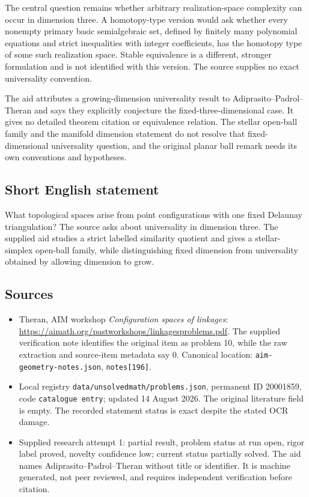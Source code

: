 \documentclass[11pt]{article}
\begin{document}
The central question remains whether arbitrary realization-space complexity can occur in dimension three. A homotopy-type version would ask whether every nonempty primary basic semialgebraic set, defined by finitely many polynomial equations and strict inequalities with integer coefficients, has the homotopy type of some such realization space. Stable equivalence is a different, stronger formulation and is not identified with this version. The source supplies no exact universality convention.

The aid attributes a growing-dimension universality result to Adiprasito--Padrol--Theran and says they explicitly conjecture the fixed-three-dimensional case. It gives no detailed theorem citation or equivalence relation. The stellar open-ball family and the manifold dimension statement do not resolve that fixed-dimensional universality question, and the original planar ball remark needs its own conventions and hypotheses.
\subsection{Short English statement}
What topological spaces arise from point configurations with one fixed Delaunay triangulation? The source asks about universality in dimension three. The supplied aid studies a strict labelled similarity quotient and gives a stellar-simplex open-ball family, while distinguishing fixed dimension from universality obtained by allowing dimension to grow.
\subsection{Sources}
\begin{itemize}
\item Theran, AIM workshop \emph{Configuration spaces of linkages}: \url{https://aimath.org/pastworkshops/linkagesproblems.pdf}. The supplied verification note identifies the original item as problem 10, while the raw extraction and source-item metadata say 0. Canonical location: \texttt{aim-geometry-notes.json}, \texttt{notes[196]}.
\item Local registry \texttt{data/unsolvedmath/problems.json}, permanent ID 20001859, code \texttt{catalogue entry}; updated 14 August 2026. The original literature field is empty. The recorded statement status is exact despite the stated OCR damage.
\item Supplied research attempt 1: partial result, problem status at run open, rigor label proved, novelty confidence low; current status partially solved. The aid names Adiprasito--Padrol--Theran without title or identifier. It is machine generated, not peer reviewed, and requires independent verification before citation.
\end{itemize}
\end{document}
